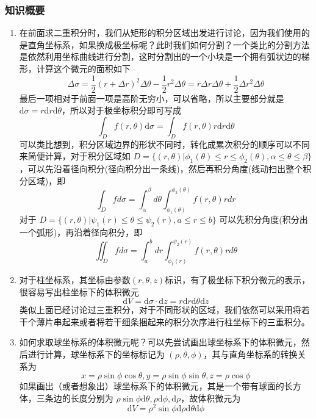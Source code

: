\subsubsection{知识概要}
\begin{enumerate}
    \item 在前面求二重积分时，我们从矩形的积分区域出发进行讨论，因为我们使用的是直角坐标系，如果换成极坐标呢？此时我们如何分割？一个类比的分割方法是依然利用坐标曲线进行分割，这时分割出的一个小块是一个拥有弧状边的梯形，计算这个微元的面积如下
    $$
    \Delta\sigma=\frac12(r+\Delta r)^2\Delta\theta-\frac12r^2\Delta\theta=r\Delta r\Delta\theta+\frac12\Delta r^2\Delta\theta
    $$
    最后一项相对于前面一项是高阶无穷小，可以省略，所以主要部分就是 $\mathrm{d} \sigma = r \mathrm{d}r \mathrm{d} \theta $，所以对于极坐标积分即可写成
    $$
    \int _D f(r, \theta) \mathrm{d} \sigma = \int _D f(r, \theta) r \mathrm{d}r \mathrm{d} \theta
    $$
    可以类比想到，积分区域边界的形状不同时，转化成累次积分的顺序可以不同来简便计算，对于积分区域如 $D=\{(r,\theta)|\phi_1(\theta)\leq r\leq\phi_2(\theta),\alpha\leq\theta\leq\beta\}$，可以先沿着径向积分(径向积分出一条线)，然后再积分角度(线动扫出整个积分区域)，即
    $$
    \int_Dfd\sigma=\int_\alpha^\beta d\theta\int_{\phi_1(\theta)}^{\phi_2(\theta)}f(r,\theta)rdr
    $$
    对于 $D=\{(r,\theta)|\psi_{1}(r)\leq\theta\leq\psi_{2}(r),a\leq r\leq b\}$ 可以先积分角度(积分出一个弧形)，再沿着径向积分，即
    $$
    \iint_Dfd\sigma=\int_a^bdr\int_{\phi_1(r)}^{\psi_2(r)}f(r,\theta)rd\theta
    $$

    \item 对于柱坐标系，其坐标由参数$(r, \theta, z)$标识，有了极坐标下积分微元的表示，很容易写出柱坐标下的体积微元
    $$
    \mathrm{d} V = \mathrm{d} \sigma \cdot \mathrm{d} z = r \mathrm{d} r \mathrm{d} \theta \mathrm{d} z
    $$
    类似上面已经讨论过三重积分，对于不同形状的区域，我们依然可以采用将若干个薄片串起来或者将若干细条捆起来的积分次序进行柱坐标下的三重积分。

    \item 如何求取球坐标系的体积微元呢？可以先尝试画出球坐标系下的体积微元，然后进行计算，球坐标系下的坐标标记为 $(\rho, \theta, \phi)$，其与直角坐标系的转换关系为
    $$
    x=\rho\sin\phi\cos\theta,y=\rho\sin\phi\sin\theta,z=\rho\cos\phi
    $$
    如果画出（或者想象出）球坐标系下的体积微元，其是一个带有球面的长方体，三条边的长度分别为 $\rho \sin \phi \mathrm{d} \theta, \rho \mathrm{d} \phi, \mathrm{d} \rho$，故体积微元为
    $$
    \mathrm{d} V = \rho^2 \sin \phi \mathrm{d} \rho \mathrm{d} \theta \mathrm{d} \phi
    $$
\end{enumerate}

